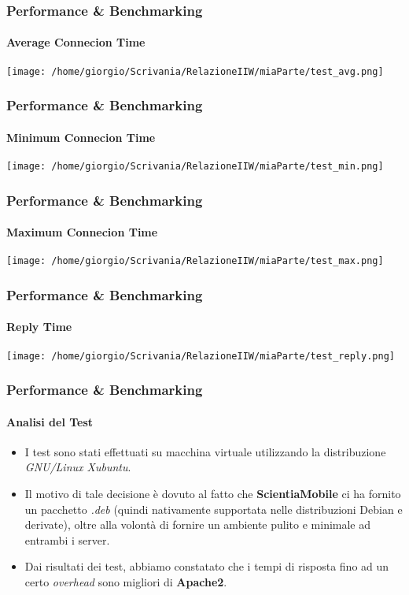 \documentclass{beamer}
\begin{document}
\begin{frame}
\frametitle{Performance \& Benchmarking}
\framesubtitle{Average Connecion Time}
\begin{center}


\texttt{[image: /home/giorgio/Scrivania/RelazioneIIW/miaParte/test\_avg.png]}
\end{center}
\end{frame}



\begin{frame}
\frametitle{Performance \& Benchmarking}
\framesubtitle{Minimum Connecion Time}
\begin{center}


\texttt{[image: /home/giorgio/Scrivania/RelazioneIIW/miaParte/test\_min.png]}
\end{center}
\end{frame}




\begin{frame}
\frametitle{Performance \& Benchmarking}
\framesubtitle{Maximum Connecion Time}
\begin{center}


\texttt{[image: /home/giorgio/Scrivania/RelazioneIIW/miaParte/test\_max.png]}
\end{center}
\end{frame}




\begin{frame}
\frametitle{Performance \& Benchmarking}
\framesubtitle{Reply Time}
\begin{center}


\texttt{[image: /home/giorgio/Scrivania/RelazioneIIW/miaParte/test\_reply.png]}
\end{center}
\end{frame}






\begin{frame}
\frametitle{Performance \& Benchmarking}
\framesubtitle{Analisi del Test}

\begin{itemize}
\item I test sono stati effettuati su macchina virtuale utilizzando la distribuzione \textit{GNU/Linux Xubuntu}.
\item Il motivo di tale decisione è dovuto
al fatto che \textbf{ScientiaMobile} ci ha fornito un pacchetto \textit{.deb} (quindi nativamente
supportata nelle distribuzioni Debian e derivate), oltre alla volontà di fornire un
ambiente pulito e minimale ad entrambi i server.
\item Dai risultati dei test, abbiamo constatato che i tempi di risposta fino ad un certo \textit{overhead} sono migliori di \textbf{Apache2}.
\end{itemize}
\end{frame}
\end{document}
